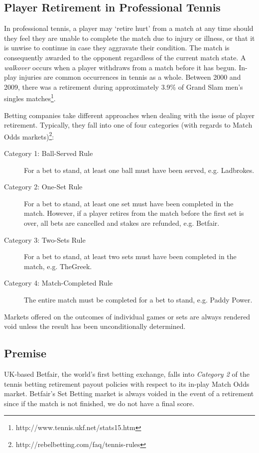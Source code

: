 \documentclass[letterpaper,12pt]{article}
\begin{document}
\subsection{Player Retirement in Professional Tennis}

In professional tennis, a player may `retire hurt' from a match at any time should they feel they are unable to complete the match due to injury or illness, or that it is unwise to continue in case they aggravate their condition.  The match is consequently awarded to the opponent regardless of the current match state.  A \textit{walkover} occurs when a player withdraws from a match before it has begun.  In-play injuries are common occurrences in tennis as a whole.  Between 2000 and 2009, there was a retirement during approximately 3.9\% of Grand Slam men's singles matches\footnote{http://www.tennis.ukf.net/stats15.htm}.

Betting companies take different approaches when dealing with the issue of player retirement.  Typically, they fall into one of four categories (with regards to Match Odds markets)\footnote{http://rebelbetting.com/faq/tennis-rules}:

\begin{description}
	\item[Category 1: Ball-Served Rule] For a bet to stand, at least one ball must have been served, e.g. Ladbrokes.
	\item[Category 2: One-Set Rule] For a bet to stand, at least one set must have been completed in the match.  However, if a player retires from the match before the first set is over, all bets are cancelled and stakes are refunded, e.g. Betfair.
	\item[Category 3: Two-Sets Rule] For a bet to stand, at least two sets must have been completed in the match, e.g. TheGreek.
	\item[Category 4: Match-Completed Rule] The entire match must be completed for a bet to stand, e.g. Paddy Power.
\end{description}

Markets offered on the outcomes of individual games or sets are always rendered void unless the result has been unconditionally determined.

\subsection{Premise}

UK-based Betfair, the world's first betting exchange, falls into \textit{Category 2} of the tennis betting retirement payout policies with respect to its in-play Match Odds market.  Betfair's Set Betting market is always voided in the event of a retirement since if the match is not finished, we do not have a final score.
\end{document}
